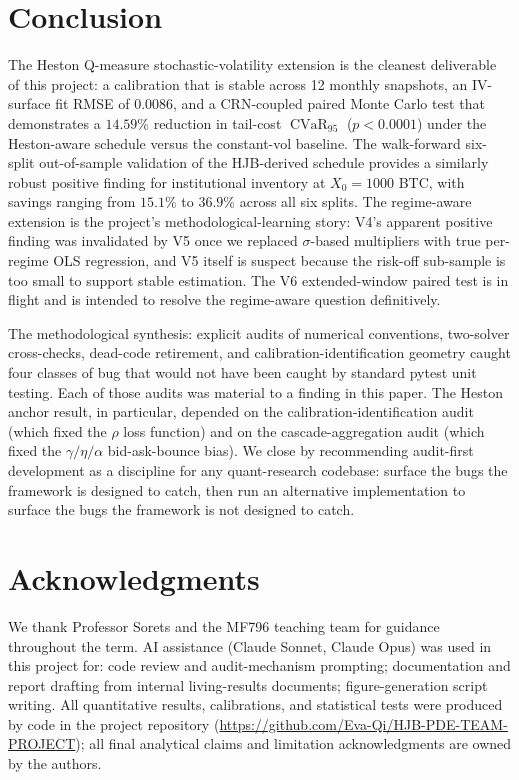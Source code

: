 \documentclass[11pt,letterpaper]{article}
\newcommand{\CVaR}{\operatorname{CVaR}}
\begin{document}
\section{Conclusion}
\label{sec:conclusion}

The Heston Q-measure stochastic-volatility extension is the cleanest deliverable of this project: a calibration that is stable across 12 monthly snapshots, an IV-surface fit RMSE of \(0.0086\), and a CRN-coupled paired Monte Carlo test that demonstrates a \(14.59\%\) reduction in tail-cost \(\CVaR_{95}\) (\(p<0.0001\)) under the Heston-aware schedule versus the constant-vol baseline. The walk-forward six-split out-of-sample validation of the HJB-derived schedule provides a similarly robust positive finding for institutional inventory at \(X_0=1000\) BTC, with savings ranging from \(15.1\%\) to \(36.9\%\) across all six splits. The regime-aware extension is the project's methodological-learning story: V4's apparent positive finding was invalidated by V5 once we replaced \(\sigma\)-based multipliers with true per-regime OLS regression, and V5 itself is suspect because the risk-off sub-sample is too small to support stable estimation. The V6 extended-window paired test is in flight and is intended to resolve the regime-aware question definitively.

The methodological synthesis: explicit audits of numerical conventions, two-solver cross-checks, dead-code retirement, and calibration-identification geometry caught four classes of bug that would not have been caught by standard pytest unit testing. Each of those audits was material to a finding in this paper. The Heston anchor result, in particular, depended on the calibration-identification audit (which fixed the \(\rho\) loss function) and on the cascade-aggregation audit (which fixed the \(\gamma/\eta/\alpha\) bid-ask-bounce bias). We close by recommending audit-first development as a discipline for any quant-research codebase: surface the bugs the framework is designed to catch, then run an alternative implementation to surface the bugs the framework is not designed to catch.

\section*{Acknowledgments}

We thank Professor Sorets and the MF796 teaching team for guidance throughout the term. AI assistance (Claude Sonnet, Claude Opus) was used in this project for: code review and audit-mechanism prompting; documentation and report drafting from internal living-results documents; figure-generation script writing. All quantitative results, calibrations, and statistical tests were produced by code in the project repository (\url{https://github.com/Eva-Qi/HJB-PDE-TEAM-PROJECT}); all final analytical claims and limitation acknowledgments are owned by the authors.
\end{document}
